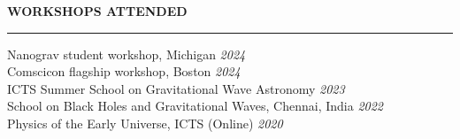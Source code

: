 \documentclass{resume} %
\renewenvironment{rSection}[1]{
\sectionskip
\textbf{\textcolor{C2}{\MakeUppercase{#1}}}
\sectionlineskip
\hrule
\begin{list}{}{
\setlength{\leftmargin}{1.5em}
}
\item[]
}{
\end{list}
}
\begin{document}
\begin{rSection}{Workshops Attended }
    {Nanograv student workshop, Michigan} \hfill {\em 2024}\\
    {Comscicon flagship workshop, Boston} \hfill {\em 2024}\\
    {ICTS Summer School on Gravitational Wave Astronomy} \hfill {\em2023}\\
    {School on Black Holes and Gravitational Waves, Chennai, India} \hfill {\em 2022}\\
    {Physics of the Early Universe, ICTS (Online)} \hfill {\em 2020}
    
\end{rSection}
\end{document}
